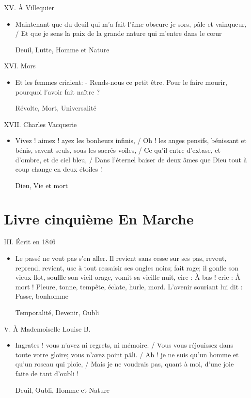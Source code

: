 \documentclass[french,a4paper,11pt,answers]{exam}
\newcommand{\cit}[2]{\og #1 \fg{} \begin{solution}{ #2 }\end{solution}} %
\begin{document}
	\begin{cadre}{XV. À Villequier}
		\begin{itemize}
			\item \cit{Maintenant que du deuil qui m'a fait l'âme obscure je sors, pâle et vainqueur, / Et que je sens la paix de la grande nature qui m'entre dans le c\oe{}ur}
				{Deuil, Lutte, Homme et Nature}
		\end{itemize}
	\end{cadre}
	
	\begin{cadre}{XVI. Mors}
		\begin{itemize}
			\item \cit{Et les femmes criaient: - Rends-nous ce petit être. Pour le faire mourir, pourquoi l'avoir fait naître ?}
				{Révolte, Mort, Universalité}
		\end{itemize}
	\end{cadre}
	
	\begin{cadre}{XVII. Charles Vacquerie}
		\begin{itemize}
			\item \cit{Vivez ! aimez ! ayez les bonheurs infinis, / Oh ! les anges pensifs, bénissant et bénis, savent seuls, sous les sacrés voiles, / Ce qu'il entre d'extase, et d'ombre, et de ciel bleu, / Dans l'éternel baiser de deux âmes que Dieu tout à coup change en deux étoiles !}
				{Dieu, Vie et mort}
		\end{itemize}
	\end{cadre}

	\section{Livre cinquième \og En Marche \fg}
	
	\begin{cadre}{III. Écrit en 1846}
		\begin{itemize}
			\item \cit{Le passé ne veut pas s'en aller. Il revient sans cesse sur ses pas, reveut, reprend, revient, use à tout ressaisir ses ongles noirs; fait rage; il gonfle son vieux flot, souffle son vieil orage, vomit sa vieille nuit, cire : À bas ! crie : À mort ! Pleure, tonne, tempête, éclate, hurle, mord. L'avenir souriant lui dit : Passe, bonhomme}
				{Temporalité, Devenir, Oubli}
		\end{itemize}
	\end{cadre}
	
	\begin{cadre}{V. À Mademoiselle Louise B.}
		\begin{itemize}
			\item \cit{Ingrates ! vous n'avez ni regrets, ni mémoire. / Vous vous réjouissez dans toute votre gloire; vous n'avez point pâli. / Ah ! je ne suis qu'un homme et qu'un roseau qui ploie, / Mais je ne voudrais pas, quant à moi, d'une joie faite de tant d'oubli !}
				{Deuil, Oubli, Homme et Nature}
		\end{itemize}
	\end{cadre}
	
\end{document}
